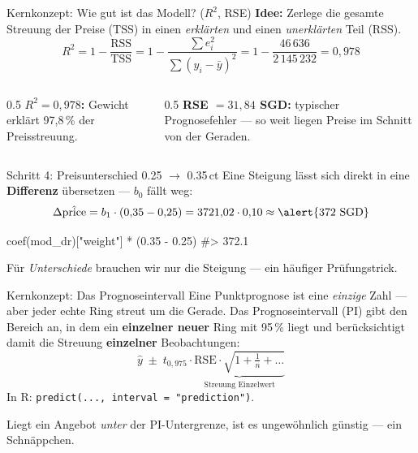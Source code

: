 \documentclass[aspectratio=169,11pt]{beamer}
\begin{document}
\begin{frame}{Kernkonzept: Wie gut ist das Modell? ($R^2$, RSE)}
\textbf{Idee:} Zerlege die gesamte Streuung der Preise (TSS) in einen
\emph{erklärten} und einen \emph{unerklärten} Teil (RSS).
\[
  R^2 = 1 - \frac{\text{RSS}}{\text{TSS}}
      = 1 - \frac{\sum e_i^2}{\sum (y_i - \bar y)^2}
      = 1 - \frac{46\,636}{2\,145\,232} = 0{,}978
\]
\vspace{-0.1cm}
\begin{center}
\end{center}
\begin{columns}[T]
\begin{column}{0.5\textwidth}
\textbf{$R^2 = 0{,}978$:} Gewicht erklärt 97{,}8\,\% der Preisstreuung.
\end{column}
\begin{column}{0.5\textwidth}
\textbf{RSE $= 31{,}84$ SGD:} typischer Prognosefehler --- so weit liegen
Preise im Schnitt von der Geraden.
\end{column}
\end{columns}
\end{frame}

\begin{frame}[fragile]{Schritt 4: Preisunterschied 0.25 $\to$ 0.35\,ct}
Eine Steigung lässt sich direkt in eine \textbf{Differenz} übersetzen ---
$b_0$ fällt weg:
\[
  \Delta\hat{\text{price}} = b_1 \cdot (0{,}35 - 0{,}25)
  = 3721{,}02 \cdot 0{,}10 \approx \alert{372 \text{ SGD}}
\]
\begin{rcode}
coef(mod_dr)["weight"] * (0.35 - 0.25)
#>   372.1
\end{rcode}
\vspace{0.2cm}
\begin{merke}
Für \emph{Unterschiede} brauchen wir nur die Steigung --- ein häufiger
Prüfungstrick.
\end{merke}
\end{frame}

\begin{frame}{Kernkonzept: Das Prognoseintervall}
Eine Punktprognose ist eine \emph{einzige} Zahl --- aber jeder echte Ring
streut um die Gerade. Das \alert{Prognoseintervall (PI)} gibt den Bereich
an, in dem ein \textbf{einzelner neuer} Ring mit 95\,\% liegt und
berücksichtigt damit die Streuung \textbf{einzelner} Beobachtungen:
\[
  \hat y \;\pm\; t_{0{,}975}\cdot \underbrace{\text{RSE}\cdot\sqrt{1+\tfrac1n+\dots}}_{\text{Streuung Einzelwert}}
\]
\centering In R: \texttt{predict(..., interval = "prediction")}.

\raggedright
\begin{merke}
Liegt ein Angebot \emph{unter} der PI-Untergrenze, ist es ungewöhnlich
günstig --- ein \alert{Schnäppchen}.
\end{merke}
\end{frame}
\end{document}
